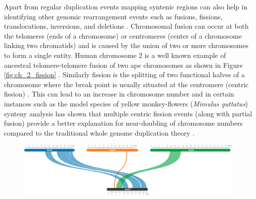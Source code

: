 Apart from regular duplication events mapping syntenic regions can also help in identifying other genomic rearrangement events such as fusions, fissions, translocations, inversions, and deletions \cite{wei2002comparative,o1999promise}. Chromosomal fusion can occur at both the telomeres (ends of a chromosome) or centromeres (center of a chromosome linking two chromatids) and is caused by the union of two or more chromosomes to form a single entity. Human chromosome 2 is a well known example of ancestral telomere-telomere fusion of two ape chromosomes as shown in Figure \ref{fig:ch_2_fission} \cite{ijdo1991origin}. Similarly fission is the splitting of two functional halves of a chromosome where the break point is usually situated at the centromere (centric fission) \cite{rieger2012glossary}. This can lead to an increase in chromosome number and in certain instances such as the model species of yellow monkey-flowers (\textit{Mimulus guttatus}) synteny analysis has shown that multiple centric fission events (along with partial fusion) provide a better explanation for near-doubling of chromosome numbers compared to the traditional whole genome duplication theory \cite{fishman2014comparative}. 

\begin{figure}[ht]
  \centering
  \includegraphics[width=.95\linewidth]{images/ch_2_complex.PNG}
  \label{fig:ch_2_complex}
\end{figure}


